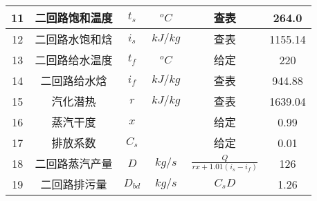 \begin{table}[H]
{\begin{tabular}{|c|c|c|c|c|c|}
            11   & 二回路饱和温度   & $ t_s $        & $ ^oC $   & 查表                                                                                           & 264.0   \\ \hline
            12   & 二回路水饱和焓   & $ i_s $        & $ kJ/kg $ & 查表                                                                                           & 1155.14 \\ \hline
            13   & 二回路给水温度   & $ t_f $        & $ ^oC $   & 给定                                                                                           & 220     \\ \hline
            14   & 二回路给水焓     & $ i_f $        & $ kJ/kg $ & 查表                                                                                           & 944.88  \\ \hline
            15   & 汽化潜热         & $ r $          & $ kJ/kg $ & 查表                                                                                           & 1639.04 \\ \hline
            16   & 蒸汽干度         & $ x $          &           & 给定                                                                                           & 0.99    \\ \hline
            17   & 排放系数         & $ C_s $        &           & 给定                                                                                           & 0.01    \\ \hline
            18   & 二回路蒸汽产量   & $ D $          & $ kg/s $  & $ \frac{Q}{r x+1.01\left(i_{s}-i_{f}\right)} $                                                 & 126     \\ \hline
            19   & 二回路排污量     & $ D_{bd} $     & $ kg/s $  & $ C_s D $                                                                                      & 1.26    \\ \hline
        \end{tabular}
    }
\end{table}

